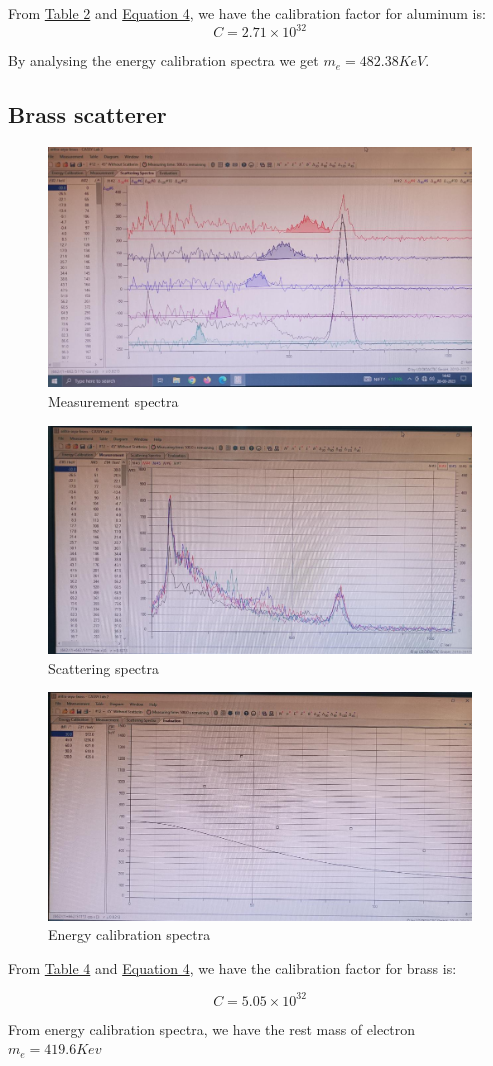 		
		

		From \hyperref[tab:2]{Table 2} and \hyperref[eq:4]{Equation 4}, we have the calibration factor for aluminum is:
		$$C=2.71\times 10^{32}$$

		By analysing the energy calibration spectra we get $m_e=482.38 KeV$.


	\subsection{Brass scatterer}
		\begin{figure}[H]
			\centering
			\includegraphics[width=0.75\columnwidth]{images/o_6.png}
			\caption{Measurement spectra}
			\label{graph:4}
		\end{figure}
		\begin{figure}[H]
			\centering
			\includegraphics[width=0.75\columnwidth]{images/o_7.png}
			\caption{Scattering spectra}
			\label{graph:5}
		\end{figure}
		\begin{figure}[H]
			\centering
			\includegraphics[width=0.75\columnwidth]{images/o_5.png}
			\caption{Energy calibration spectra}
			\label{graph:6}
		\end{figure}

		
		

		From \hyperref[tab:4]{Table 4} and \hyperref[eq:4]{Equation 4}, we have the calibration factor for brass is:
		
		$$C=5.05\times 10^{32}$$
		
		From energy calibration spectra, we have the rest mass of electron $m_e =419.6Kev$
